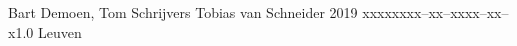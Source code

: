 \documentclass{tstextbook}
\begin{document}
       {Bart Demoen, Tom Schrijvers}
       {Tobias van Schneider}
       {2019}
       {xxxxx}{xxx--xx--xxxx--xx--x}{1.0}
       {}
       {Leuven}

% 
% 
% 
% 










 






% 
\end{document}
